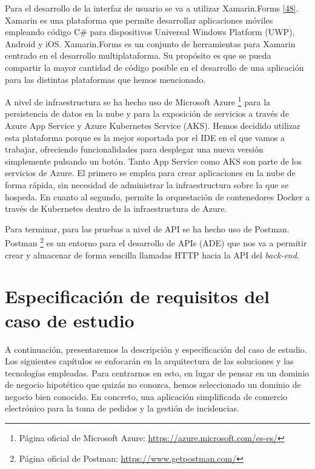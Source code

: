 \documentclass[11pt,spanish,listoffigures]{tfgetsinf}
\begin{document}
Para el desarrollo de la interfaz de usuario se va a utilizar Xamarin.Forms \hyperlink{page.80}{[48]}. Xamarin es una plataforma que permite desarrollar aplicaciones móviles empleando código C\# para dispositivos Universal Windows Platform (UWP), Android y iOS. Xamarin.Forms es un conjunto de herramientas para Xamarin centrado en el desarrollo multiplataforma. Su propósito es que se pueda compartir la mayor cantidad de código posible en el desarrollo de una aplicación para las distintas plataformas que hemos mencionado.

A nivel de infraestructura se ha hecho uso de Microsoft Azure \footnote{ Página oficial de Microsoft Azure: \url{https://azure.microsoft.com/es-es/}} para la persistencia de datos en la nube y para la exposición de servicios a través de Azure App Service y Azure Kubernetes Service (AKS). Hemos decidido utilizar esta plataforma porque es la mejor soportada por el IDE en el que vamos a trabajar, ofreciendo funcionalidades para desplegar una nueva versión simplemente pulsando un botón. Tanto App Service como AKS son parte de los servicios de Azure. El primero se emplea para crear aplicaciones en la nube de forma rápida, sin necesidad de administrar la infraestructura sobre la que se hospeda. En cuanto al segundo, permite la orquestación de contenedores Docker a través de Kubernetes dentro de la infraestructura de Azure.

Para terminar, para las pruebas a nivel de API se ha hecho uso de Postman. Postman \footnote{ Página oficial de Postman: \url{https://www.getpostman.com/}} es un entorno para el desarrollo de APIs (ADE) que nos va a permitir crear y almacenar de forma sencilla llamadas HTTP hacia la API del \textit{back-end}.


\chapter{Especificación de requisitos del caso de estudio}

A continuación, presentaremos la descripción y especificación del caso de estudio. Los siguientes capítulos se enfocarán en la arquitectura de las soluciones y las tecnologías empleadas. Para centrarnos en esto, en lugar de pensar en un dominio de negocio hipotético que quizás no conozca, hemos seleccionado un dominio de negocio bien conocido. En concreto, una aplicación simplificada de comercio electrónico para la toma de pedidos y la gestión de incidencias.
\end{document}

